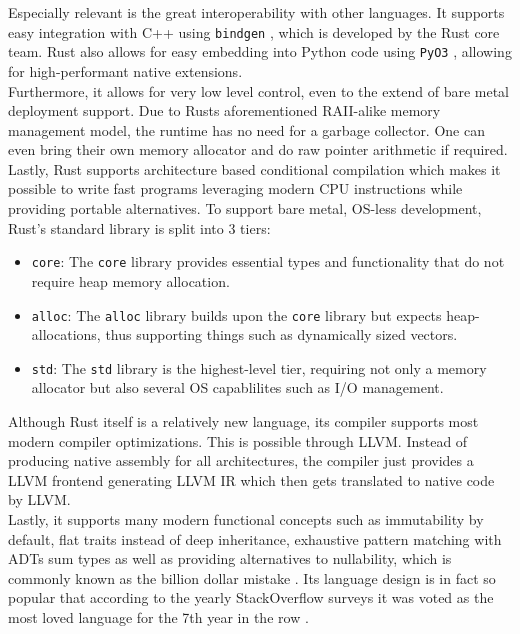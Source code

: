 Especially relevant is the great interoperability with other languages. It supports easy integration with C++ using \texttt{bindgen} \cite{bindgen}, which is developed by the Rust core team. Rust also allows for easy embedding into Python code using \texttt{PyO3} \cite{pyo3}, allowing for high-performant native extensions.\\

Furthermore, it allows for very low level control, even to the extend of bare metal deployment support. Due to Rusts aforementioned \ac{RAII}-alike memory management model, the runtime has no need for a garbage collector. One can even bring their own memory allocator and do raw pointer arithmetic if required. Lastly, Rust supports architecture based conditional compilation which makes it possible to write fast programs leveraging modern CPU instructions while providing portable alternatives. To support bare metal, OS-less development, Rust's standard library is split into 3 tiers:

\begin{itemize}
  \item \texttt{core}: The \texttt{core} library provides essential types and functionality that do not require heap memory allocation.
  \item \texttt{alloc}: The \texttt{alloc} library builds upon the \texttt{core} library but expects heap-allocations, thus supporting things such as dynamically sized vectors.
  \item \texttt{std}: The \texttt{std} library is the highest-level tier, requiring not only a memory allocator but also several OS capablilites such as I/O management.
\end{itemize}

Although Rust itself is a relatively new language, its compiler supports most modern compiler optimizations. This is possible through \ac{LLVM}. Instead of producing native assembly for all architectures, the compiler just provides a \ac{LLVM} frontend generating \ac{LLVM} \ac{IR} which then gets translated to native code by \ac{LLVM}.\\

Lastly, it supports many modern functional concepts such as immutability by default, flat traits instead of deep inheritance, exhaustive pattern matching with \acp{ADT} sum types as well as providing alternatives to nullability, which is commonly known as the billion dollar mistake \cite{null}. Its language design is in fact so popular that according to the yearly StackOverflow surveys it was voted as the most loved language for the 7th year in the row \cite{sosurvey}.

